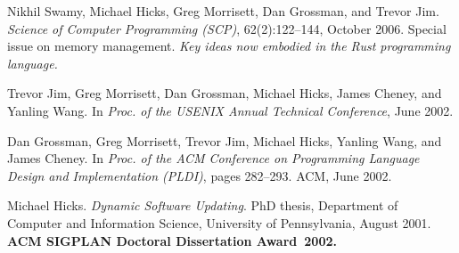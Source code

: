 \documentclass[11pt]{article}
\begin{document}
\begin{description}

   \item
   Nikhil Swamy, Michael Hicks, Greg Morrisett, Dan Grossman, and Trevor Jim.
 {\em Science of Computer Programming (SCP)}, 62(2):122--144, October
  2006.
 Special issue on memory management. \emph{Key ideas 
   now embodied in the Rust programming language.}

   
\item Trevor Jim, Greg Morrisett, Dan Grossman, Michael Hicks, James
  Cheney, and Yanling Wang.
  In
  {\em Proc. of the {USENIX} Annual Technical Conference}, 
  June 2002.

 \item Dan Grossman, Greg Morrisett, Trevor Jim, Michael Hicks, Yanling
   Wang, and James Cheney.
   In {\em Proc. of the {ACM} Conference on
     Programming Language Design and Implementation (PLDI)}, pages
   282--293. {ACM}, June 2002.

\item 
Michael Hicks.
 {\em Dynamic Software Updating}.
 PhD thesis, Department of Computer and Information Science,
  University of Pennsylvania, August 2001.
\textbf{ACM SIGPLAN Doctoral Dissertation Award~2002.}

\end{description}
\end{document}

